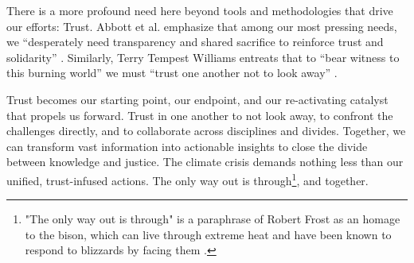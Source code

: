 There is a more profound need here beyond tools and methodologies that drive our efforts: Trust. Abbott et al. emphasize that among our most pressing needs, we “desperately need transparency and shared sacrifice to reinforce trust and solidarity” \citep[p. 24]{abbott_emergency_2023}. Similarly, Terry Tempest Williams entreats that to “bear witness to this burning world” we must “trust one another not to look away” \citep[47:00]{williams_practice_2024}. 

Trust becomes our starting point, our endpoint, and our re-activating catalyst that propels us forward. Trust in one another to not look away, to confront the challenges directly, and to collaborate across disciplines and divides. Together, we can transform vast information into actionable insights to close the divide between knowledge and justice. The climate crisis demands nothing less than our unified, trust-infused actions. The only way out is through\footnote{"The only way out is through" is a paraphrase of Robert Frost \citep[p. 66]{frost_north_1917} as an homage to the bison, which can live through extreme heat \citep{world_wildlife_fund_meet_nodate} and have been known to respond to blizzards by facing them \citep{dapcevich_bison_2024}.}, and together.


